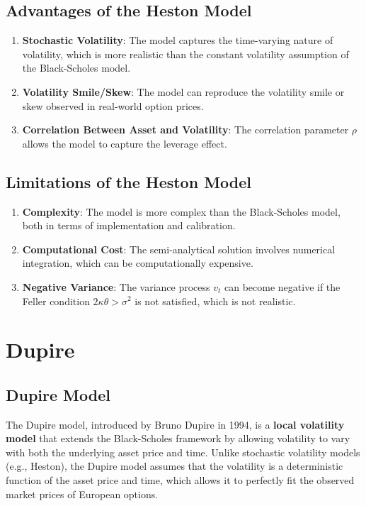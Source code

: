 \documentclass[11pt, oneside, a4paper, titlepage]{report}
\begin{document}
\subsection{Advantages of the Heston Model}

\begin{enumerate}
    \item \textbf{Stochastic Volatility}: The model captures the time-varying nature of volatility, which is more realistic than the constant volatility assumption of the Black-Scholes model.
    \item \textbf{Volatility Smile/Skew}: The model can reproduce the volatility smile or skew observed in real-world option prices.
    \item \textbf{Correlation Between Asset and Volatility}: The correlation parameter \( \rho \) allows the model to capture the leverage effect.
\end{enumerate}

\subsection{Limitations of the Heston Model}

\begin{enumerate}
    \item \textbf{Complexity}: The model is more complex than the Black-Scholes model, both in terms of implementation and calibration.
    \item \textbf{Computational Cost}: The semi-analytical solution involves numerical integration, which can be computationally expensive.
    \item \textbf{Negative Variance}: The variance process \( v_t \) can become negative if the Feller condition \( 2 \kappa \theta > \sigma^2 \) is not satisfied, which is not realistic.
\end{enumerate}

\section{Dupire}
\subsection{Dupire Model}

The Dupire model, introduced by Bruno Dupire in 1994, is a \textbf{local volatility model} that extends the Black-Scholes framework by allowing volatility to vary with both the underlying asset price and time. Unlike stochastic volatility models (e.g., Heston), the Dupire model assumes that the volatility is a deterministic function of the asset price and time, which allows it to perfectly fit the observed market prices of European options.
\end{document}
